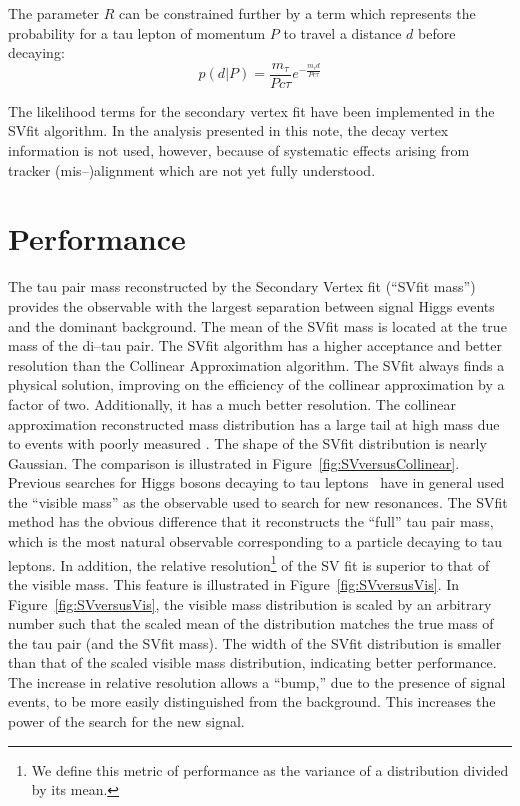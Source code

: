 The parameter $R$ can be constrained further by a term which represents the
probability for a tau lepton of momentum $P$ to travel a distance $d$ before
decaying:
\begin{equation*}
p \left( d | P \right) = \frac{m_\tau}{P c\tau}e^{-\frac{m_\tau d}{P c\tau}}
\end{equation*}

The likelihood terms for the secondary vertex fit have been implemented in the
SVfit algorithm.  In the analysis presented in this note, the decay vertex
information is not used, however, because of systematic effects arising from
tracker (mis--)alignment which are not yet fully understood.

\section{Performance}

The tau pair mass reconstructed by the Secondary Vertex fit (``SVfit mass'')
provides the observable with the largest separation between signal Higgs events
and the dominant \ZTT background.  The mean of the SVfit mass is located at the
true mass of the di--tau pair.  The SVfit algorithm has a higher acceptance and
better resolution than the Collinear Approximation algorithm.  The SVfit always
finds a physical solution, improving on the efficiency of the collinear
approximation by a factor of two.  Additionally, it has a much better
resolution.  The collinear approximation reconstructed mass distribution has a
large tail at high mass due to events with poorly measured \MET\@.  The shape of
the SVfit distribution is nearly Gaussian.  The comparison is illustrated in
Figure~\ref{fig:SVversusCollinear}.  Previous searches for Higgs bosons decaying
to tau leptons~\cite{CDFMSSMHiggs} have in general used the ``visible mass'' as the
observable used to search for new resonances.  The SVfit method has the obvious
difference that it reconstructs the ``full'' tau pair mass, which is the most
natural observable corresponding to a particle decaying to tau leptons.  In
addition, the relative resolution\footnote{We define this metric of performance
as the variance of a distribution divided by its mean.}
of the SV fit is superior to that of the visible mass.  This feature is
illustrated in Figure~\ref{fig:SVversusVis}.  In Figure~\ref{fig:SVversusVis},
the visible mass distribution is scaled by an arbitrary number such that the
scaled mean of the distribution matches the true mass of the tau pair (and the
SVfit mass).  The width of the SVfit distribution is smaller than that of
the scaled visible mass distribution, indicating better performance.  The
increase in relative resolution allows a ``bump,'' due to the presence of signal
events, to be more easily distinguished from the \ZTT background.  This
increases the power of the search for the new signal.

